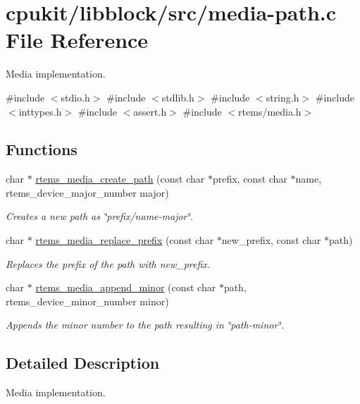 \hypertarget{media-path_8c}{}\section{cpukit/libblock/src/media-\/path.c File Reference}
\label{media-path_8c}


Media implementation.  


{\ttfamily \#include $<$stdio.\+h$>$}\newline
{\ttfamily \#include $<$stdlib.\+h$>$}\newline
{\ttfamily \#include $<$string.\+h$>$}\newline
{\ttfamily \#include $<$inttypes.\+h$>$}\newline
{\ttfamily \#include $<$assert.\+h$>$}\newline
{\ttfamily \#include $<$rtems/media.\+h$>$}\newline
\subsection*{Functions}
\begin{DoxyCompactItemize}
\item 
char $\ast$ \mbox{\hyperlink{group__RTEMSIOMedia_ga2c85c46ea44481e17888733b40de22f5}{rtems\+\_\+media\+\_\+create\+\_\+path}} (const char $\ast$prefix, const char $\ast$name, rtems\+\_\+device\+\_\+major\+\_\+number major)
\begin{DoxyCompactList}\small\item\em Creates a new path as \char`\"{}prefix/name-\/major\char`\"{}. \end{DoxyCompactList}\item 
char $\ast$ \mbox{\hyperlink{group__RTEMSIOMedia_ga8f3db3b675c208578fbbae1421bc7de6}{rtems\+\_\+media\+\_\+replace\+\_\+prefix}} (const char $\ast$new\+\_\+prefix, const char $\ast$path)
\begin{DoxyCompactList}\small\item\em Replaces the prefix of the {\itshape path} with {\itshape new\+\_\+prefix}. \end{DoxyCompactList}\item 
char $\ast$ \mbox{\hyperlink{group__RTEMSIOMedia_gaa27ae6204e7202e9bfcb82f606ceeb43}{rtems\+\_\+media\+\_\+append\+\_\+minor}} (const char $\ast$path, rtems\+\_\+device\+\_\+minor\+\_\+number minor)
\begin{DoxyCompactList}\small\item\em Appends the {\itshape minor} number to the {\itshape path} resulting in \char`\"{}path-\/minor\char`\"{}. \end{DoxyCompactList}\end{DoxyCompactItemize}


\subsection{Detailed Description}
Media implementation. 


